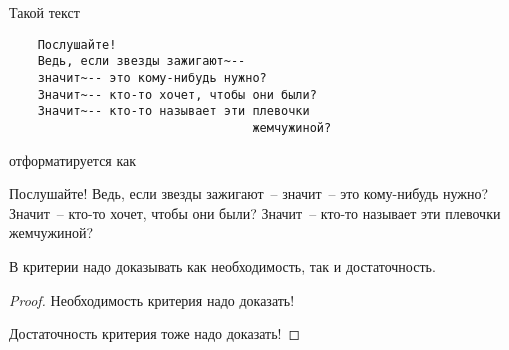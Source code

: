 \documentclass[../../main.tex]{subfiles}
\begin{document}
\begin{exmp}[Маяковский]

    Такой текст

\begin{verbatim}
    Послушайте!
    Ведь, если звезды зажигают~--
    значит~-- это кому-нибудь нужно?
    Значит~-- кто-то хочет, чтобы они были?
    Значит~-- кто-то называет эти плевочки
                                  жемчужиной?
\end{verbatim}

    отформатируется как

    \medskip

    Послушайте!
    Ведь, если звезды зажигают~--
    значит~-- это кому-нибудь нужно?
    Значит~-- кто-то хочет, чтобы они были?
    Значит~-- кто-то называет эти плевочки
                                  жемчужиной?

\end{exmp}

\begin{thm}[Критерий]
 В критерии надо доказывать как необходимость, так и
 достаточность.
\end{thm}

\begin{proof}
 \quad

 \nec Необходимость критерия надо доказать!

 \suff Достаточность критерия тоже надо доказать!

\end{proof}
\end{document}
